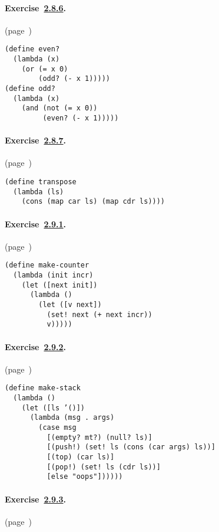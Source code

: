 \paragraph{Exercise \hyperref[start_g38]{2.8.6}. }(page \pageref{start_s158})

  
\begin{alltt}
 (define even?
   (lambda (x)
     (or (= x 0)
         (odd? (- x 1)))))
 (define odd?
   (lambda (x)
     (and (not (= x 0))
          (even? (- x 1)))))
\end{alltt}



\paragraph{Exercise \hyperref[start_g39]{2.8.7}. }(page \pageref{start_s161})

  
\begin{alltt}
 (define transpose
   (lambda (ls)
     (cons (map car ls) (map cdr ls))))
\end{alltt}



\paragraph{Exercise \hyperref[start_g41]{2.9.1}. }(page \pageref{start_s186})

  
\begin{alltt}
 (define make-counter
   (lambda (init incr)
     (let ([next init])
       (lambda ()
         (let ([v next])
           (set! next (+ next incr))
           v)))))
\end{alltt}



\paragraph{Exercise \hyperref[start_g42]{2.9.2}. }(page \pageref{start_s188})

  
\begin{alltt}
 (define make-stack
   (lambda ()
     (let ([ls '()])
       (lambda (msg . args)
         (case msg
           [(empty? mt?) (null? ls)]
           [(push!) (set! ls (cons (car args) ls))]
           [(top) (car ls)]
           [(pop!) (set! ls (cdr ls))]
           [else "oops"])))))
\end{alltt}



\paragraph{Exercise \hyperref[start_g43]{2.9.3}. }(page \pageref{start_s191})

